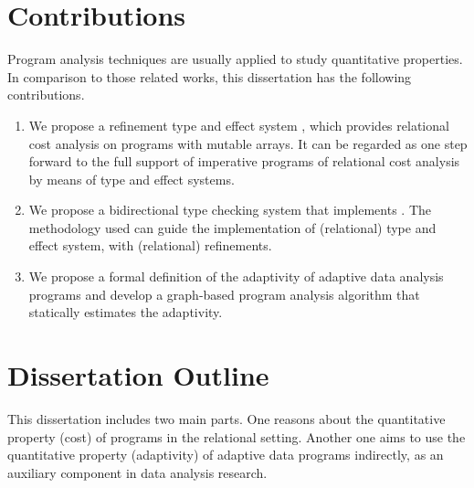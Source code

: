 
\section{Contributions}

Program analysis techniques are usually applied to study quantitative properties. In comparison to those related works, this dissertation has the following contributions.

\begin{enumerate}
\item We propose a refinement type and effect system {\Arel}, which provides relational cost analysis on programs with mutable arrays. It can be regarded as one step forward to the full support of imperative programs of relational cost analysis by means of type and effect systems.

\item We propose a bidirectional type checking system that implements {\Arel}. The methodology used can guide the implementation of (relational) type and effect system, with (relational) refinements.  

\item We propose a formal definition of the adaptivity of adaptive data analysis programs and develop a graph-based program analysis algorithm that statically estimates the adaptivity.
\end{enumerate}

\section{Dissertation Outline}
This dissertation includes two main parts. One reasons about the quantitative property (cost) of programs in the relational setting. Another one aims to use the quantitative property (adaptivity) of adaptive data programs indirectly, as an auxiliary component in data analysis research.

